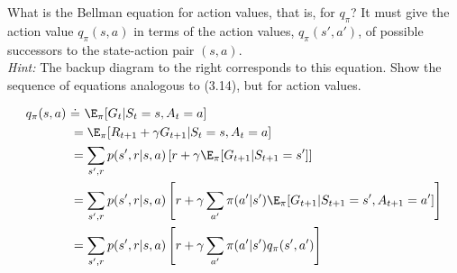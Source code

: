 
\begin{exercise}[Exercise 3.17]

What is the Bellman equation for action values, that is, for $q_\pi$? It must give
the action value $q_\pi(s,a)$ in terms of the action values, $q_\pi(s',a')$, of
possible successors to the state-action pair $(s,a)$. \\
\textit{Hint:} The backup diagram to the right corresponds to this equation.
Show the sequence of equations analogous to (3.14), but for action values.


\end{exercise}


\begin{solution}

\begin{align*}
  q_\pi(s,a) \ &\dot = \ \E_\pi[G_t | S_t = s, A_t = a] \\
  &= \E_\pi[R_{t+1} +  \gamma G_{t+1} | S_t = s, A_t = a] \\
  &= \sum_{s',r} p(s',r|s,a)\left[r + \gamma \E_\pi[G_{t+1} | S_{t+1} = s']\right] \\
  &= \sum_{s',r} p(s',r|s,a)\left[r + \gamma \sum_{a'} \pi(a'|s')\E_\pi[G_{t+1} | S_{t+1} = s', A_{t+1} = a']\right] \\
  &= \sum_{s',r} p(s',r|s,a)\left[r + \gamma \sum_{a'} \pi(a'|s') q_\pi(s',a')\right] \\
\end{align*}

\end{solution}

